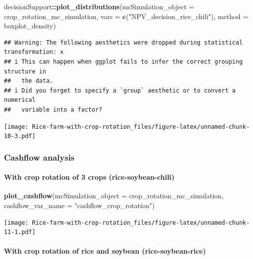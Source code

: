 \documentclass[
]{article}
\newenvironment{Shaded}{\begin{snugshade}}{\end{snugshade}}
\newcommand{\AttributeTok}[1]{\textcolor[rgb]{0.13,0.29,0.53}{#1}}
\newcommand{\FunctionTok}[1]{\textcolor[rgb]{0.13,0.29,0.53}{\textbf{#1}}}
\newcommand{\NormalTok}[1]{#1}
\newcommand{\SpecialCharTok}[1]{\textcolor[rgb]{0.81,0.36,0.00}{\textbf{#1}}}
\newcommand{\StringTok}[1]{\textcolor[rgb]{0.31,0.60,0.02}{#1}}
\begin{document}
\begin{Shaded}
\begin{Highlighting}[]
\NormalTok{decisionSupport}\SpecialCharTok{::}\FunctionTok{plot\_distributions}\NormalTok{(}\AttributeTok{mcSimulation\_object =}\NormalTok{ crop\_rotation\_mc\_simulation, }
                                    \AttributeTok{vars =} \FunctionTok{c}\NormalTok{(}\StringTok{"NPV\_decision\_rice\_chili"}\NormalTok{),}
                                    \AttributeTok{method =} \StringTok{\textquotesingle{}boxplot\_density\textquotesingle{}}\NormalTok{)}
\end{Highlighting}
\end{Shaded}

\begin{verbatim}
## Warning: The following aesthetics were dropped during statistical transformation: x
## i This can happen when ggplot fails to infer the correct grouping structure in
##   the data.
## i Did you forget to specify a `group` aesthetic or to convert a numerical
##   variable into a factor?
\end{verbatim}

\texttt{[image: Rice-farm-with-crop-rotation\_files/figure-latex/unnamed-chunk-10-3.pdf]}

\hypertarget{cashflow-analysis}{%
\subsubsection{Cashflow analysis}\label{cashflow-analysis}}

\hypertarget{with-crop-rotation-of-3-crops-rice-soybean-chili}{%
\paragraph{With crop rotation of 3 crops
(rice-soybean-chili)}\label{with-crop-rotation-of-3-crops-rice-soybean-chili}}

\begin{Shaded}
\begin{Highlighting}[]
\FunctionTok{plot\_cashflow}\NormalTok{(}\AttributeTok{mcSimulation\_object =}\NormalTok{ crop\_rotation\_mc\_simulation, }\AttributeTok{cashflow\_var\_name =} \StringTok{"cashflow\_crop\_rotation"}\NormalTok{)}
\end{Highlighting}
\end{Shaded}

\texttt{[image: Rice-farm-with-crop-rotation\_files/figure-latex/unnamed-chunk-11-1.pdf]}

\hypertarget{with-crop-rotation-of-rice-and-soybean-rice-soybean-rice}{%
\paragraph{With crop rotation of rice and soybean
(rice-soybean-rice)}\label{with-crop-rotation-of-rice-and-soybean-rice-soybean-rice}}
\end{document}
